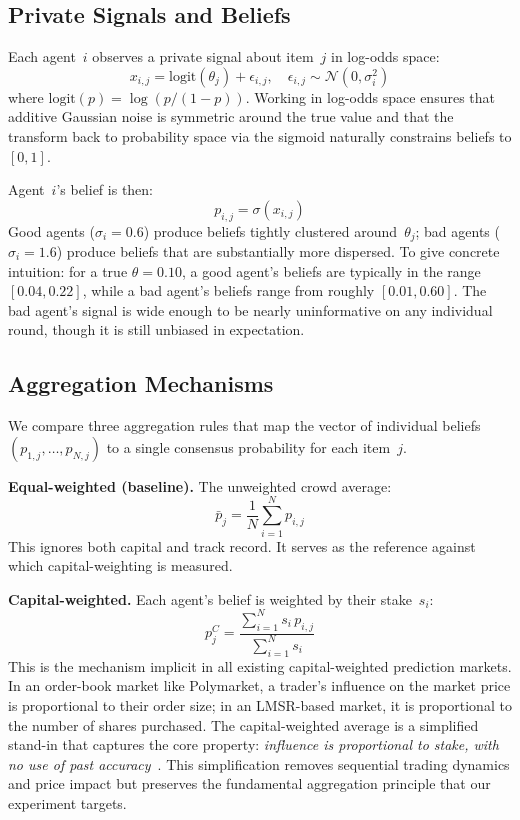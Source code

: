 \documentclass[conference]{IEEEtran}
\begin{document}
\subsection{Private Signals and Beliefs}
\label{sec:model-signals}

Each agent~$i$ observes a private signal about item~$j$ in log-odds space:
\begin{equation}
    x_{i,j} = \text{logit}(\theta_j) + \epsilon_{i,j}, \quad \epsilon_{i,j} \sim \mathcal{N}(0, \sigma_i^2)
\end{equation}
where $\text{logit}(p) = \log(p/(1-p))$. Working in log-odds space ensures that additive Gaussian noise is symmetric around the true value and that the transform back to probability space via the sigmoid naturally constrains beliefs to $[0, 1]$.

Agent~$i$'s belief is then:
\begin{equation}
    p_{i,j} = \sigma(x_{i,j})
\end{equation}%
Good agents ($\sigma_i = 0.6$) produce beliefs tightly clustered around~$\theta_j$; bad agents ($\sigma_i = 1.6$) produce beliefs that are substantially more dispersed. To give concrete intuition: for a true $\theta = 0.10$, a good agent's beliefs are typically in the range $[0.04, 0.22]$, while a bad agent's beliefs range from roughly $[0.01, 0.60]$. The bad agent's signal is wide enough to be nearly uninformative on any individual round, though it is still unbiased in expectation.

\subsection{Aggregation Mechanisms}
\label{sec:model-aggregation}

We compare three aggregation rules that map the vector of individual beliefs $(p_{1,j}, \dots, p_{N,j})$ to a single consensus probability for each item~$j$.

\textbf{Equal-weighted (baseline).} The unweighted crowd average:
\begin{equation}
    \bar{p}_j = \frac{1}{N} \sum_{i=1}^{N} p_{i,j}
\end{equation}
This ignores both capital and track record. It serves as the reference against which capital-weighting is measured.

\textbf{Capital-weighted.} Each agent's belief is weighted by their stake~$s_i$:
\begin{equation}
    p_j^C = \frac{\sum_{i=1}^{N} s_i \, p_{i,j}}{\sum_{i=1}^{N} s_i}
\end{equation}
This is the mechanism implicit in all existing capital-weighted prediction markets. In an order-book market like Polymarket, a trader's influence on the market price is proportional to their order size; in an LMSR-based market, it is proportional to the number of shares purchased. The capital-weighted average is a simplified stand-in that captures the core property: \emph{influence is proportional to stake, with no use of past accuracy}~\cite{wolfers2006,manski2006}. This simplification removes sequential trading dynamics and price impact but preserves the fundamental aggregation principle that our experiment targets.
\end{document}

